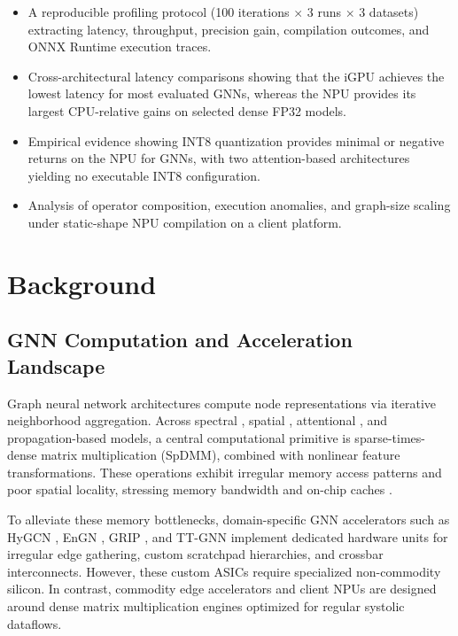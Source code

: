 \documentclass[conference]{IEEEtran}
\begin{document}
\begin{itemize}
    \item A reproducible profiling protocol (100 iterations $\times$ 3 runs $\times$ 3 datasets) extracting latency, throughput, precision gain, compilation outcomes, and ONNX Runtime execution traces.
    \item Cross-architectural latency comparisons showing that the iGPU achieves the lowest latency for most evaluated GNNs, whereas the NPU provides its largest CPU-relative gains on selected dense FP32 models.
    \item Empirical evidence showing INT8 quantization provides minimal or negative returns on the NPU for GNNs, with two attention-based architectures yielding no executable INT8 configuration.
    \item Analysis of operator composition, execution anomalies, and graph-size scaling under static-shape NPU compilation on a client platform.
\end{itemize}

\section{Background}

\subsection{GNN Computation and Acceleration Landscape}
Graph neural network architectures compute node representations via iterative neighborhood aggregation. Across spectral \cite{kipf2017gcn, pmlr-v97-wu19e}, spatial \cite{10.5555/3294771.3294869, xu2018how}, attentional \cite{velickovic2018graph, brody2022how, shi2020masked}, and propagation-based \cite{gasteiger2019appnp, pmlr-v70-gilmer17a} models, a central computational primitive is sparse-times-dense matrix multiplication (SpDMM), combined with nonlinear feature transformations. These operations exhibit irregular memory access patterns and poor spatial locality, stressing memory bandwidth and on-chip caches \cite{9161360, 9218751, 10.1145/3477141}.

To alleviate these memory bottlenecks, domain-specific GNN accelerators such as HyGCN \cite{9065592}, EnGN \cite{9161360}, GRIP \cite{9858684}, and TT-GNN \cite{10411398} implement dedicated hardware units for irregular edge gathering, custom scratchpad hierarchies, and crossbar interconnects. However, these custom ASICs require specialized non-commodity silicon. In contrast, commodity edge accelerators and client NPUs \cite{9926331, SINGH202371} are designed around dense matrix multiplication engines optimized for regular systolic dataflows.
\end{document}

